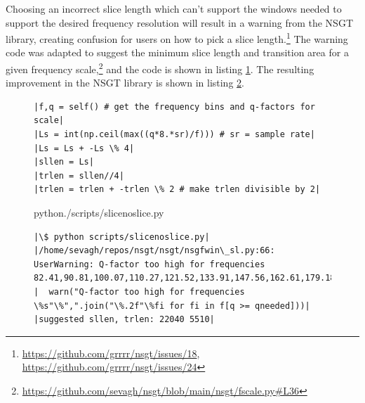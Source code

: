 \documentclass[report.tex]{subfiles}
\begin{document}
Choosing an incorrect slice length which can't support the windows needed to support the desired frequency resolution will result in a warning from the NSGT library, creating confusion for users on how to pick a slice length.\footnote{\url{https://github.com/grrrr/nsgt/issues/18}, \url{https://github.com/grrrr/nsgt/issues/24}} The warning code was adapted to suggest the minimum slice length and transition area for a given frequency scale,\footnote{\url{https://github.com/sevagh/nsgt/blob/main/nsgt/fscale.py\#L36}} and the code is shown in listing \ref{lst:suggestedsllen}. The resulting improvement in the NSGT library is shown in listing \ref{code:slicenoslice}.

\begin{figure}[h]
  \centering
\begin{verbatim}
|f,q = self() # get the frequency bins and q-factors for scale|
|Ls = int(np.ceil(max((q*8.*sr)/f))) # sr = sample rate|
|Ls = Ls + -Ls \% 4|
|sllen = Ls|
|trlen = sllen//4|
|trlen = trlen + -trlen \% 2 # make trlen divisible by 2|
\end{verbatim}
  \label{lst:suggestedsllen}
\end{figure}

\begin{figure}[h]
  \centering
 \begin{minipage}{\textwidth}
  \centering
\setlength\partopsep{-\topsep}
\begin{inputminted}[linenos,breaklines,frame=single]{python}{./scripts/slicenoslice.py}
\end{inputminted}
 \vspace{1em}
 \end{minipage}
 \begin{minipage}{\textwidth}
  \centering
\begin{verbatim}
|\$ python scripts/slicenoslice.py|
|/home/sevagh/repos/nsgt/nsgt/nsgfwin\_sl.py:66: UserWarning: Q-factor too high for frequencies 82.41,90.81,100.07,110.27,121.52,133.91,147.56,162.61,179.18,...|
|  warn("Q-factor too high for frequencies \%s"\%",".join("\%.2f"\%fi for fi in f[q >= qneeded]))|
|suggested sllen, trlen: 22040 5510|
\end{verbatim}
 \end{minipage}
  \label{code:slicenoslice}
\end{figure}
\end{document}
